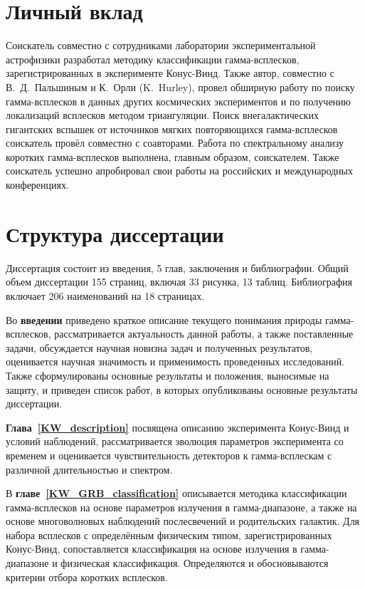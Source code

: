 \section*{Личный вклад}
Соискатель совместно с сотрудниками лаборатории экспериментальной астрофизики 
разработал методику классификации гамма-всплесков, зарегистрированных в эксперименте 
Конус-Винд. Также автор, совместно с В.~Д.~Пальшиным и К.~Орли (K.~Hurley), 
провел обширную работу по поиску гамма-всплесков в данных других космических 
экспериментов и по получению локализаций всплесков методом триангуляции.
Поиск внегалактических гигантских вспышек от источников мягких повторяющихся
гамма-всплесков соискатель провёл совместно с соавторами. 
Работа по спектральному анализу коротких гамма-всплесков выполнена, главным образом, соискателем.
Также соискатель успешно апробировал свои работы на российских и международных конференциях.

\section*{Структура диссертации}
Диссертация состоит из введения, 5 глав, заключения и библиографии.
Общий объем диссертации 155 страниц, включая 33 рисунка, 13 таблиц. 
Библиография включает 206 наименований на 18 страницах.

Во \textbf{введении} приведено краткое описание текущего понимания природы гамма-всплесков,
рассматривается актуальность данной работы, а также поставленные задачи, 
обсуждается научная новизна задач и полученных результатов, 
оценивается научная значимость и применимость проведенных исследований.
Также сформулированы основные результаты и положения, выносимые на защиту, и приведен
список работ, в которых опубликованы основные результаты диссертации.

\textbf{Глава~\ref{KW_description}} посвящена описанию эксперимента Конус-Винд и условий
наблюдений, рассматривается эволюция параметров эксперимента со временем и 
оценивается чувствительность детекторов к гамма-всплескам с различной длительностью и спектром.

В \textbf{главе~\ref{KW_GRB_classification}} описывается методика классификации 
гамма-всплесков на основе параметров излучения в гамма-диапазоне, а также на основе 
многоволновых наблюдений послесвечений и родительских галактик. Для набора всплесков
с определённым физическим типом, зарегистрированных Конус-Винд, сопоставляется 
классификация на основе излучения в гамма-диапазоне и физическая классификация.
Определяются и обосновываются критерии отбора коротких всплесков.

